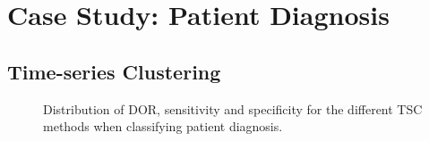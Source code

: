 \section{Case Study: Patient Diagnosis}

\subsection{Time-series Clustering}

\begin{figure}[H]
    \centering
    
    \caption{Distribution of DOR, sensitivity and specificity for the different TSC methods when classifying patient diagnosis.}
    \label{fig:tsc_ind_dor_sens_spec_dist}
\end{figure}

